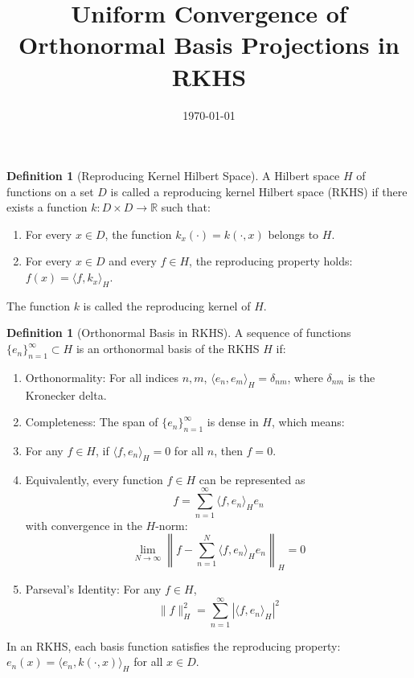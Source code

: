 \documentclass{article}
\theoremstyle{definition}
\newtheorem{definition}[theorem]{Definition}
\begin{document}
\title{Uniform Convergence of Orthonormal Basis Projections in RKHS}
\author{}
\date{\today}
\maketitle

\begin{definition}[Reproducing Kernel Hilbert Space]
A Hilbert space $H$ of functions on a set $D$ is called a reproducing kernel Hilbert space (RKHS) if there exists a function $k: D \times D \to \mathbb{R}$ such that:
\begin{enumerate}
    \item For every $x \in D$, the function $k_x(\cdot) = k(\cdot, x)$ belongs to $H$.
    \item For every $x \in D$ and every $f \in H$, the reproducing property holds: $f(x) = \langle f, k_x \rangle_H$.
\end{enumerate}
The function $k$ is called the reproducing kernel of $H$.
\end{definition}

\begin{definition}[Orthonormal Basis in RKHS]
\label{def:orthonormal_basis}
A sequence of functions $\{e_n\}_{n=1}^{\infty} \subset H$ is an orthonormal basis of the RKHS $H$ if:
\begin{enumerate}
    \item Orthonormality: For all indices $n, m$, $\langle e_n, e_m \rangle_H = \delta_{nm}$, where $\delta_{nm}$ is the Kronecker delta.
\item Completeness: The span of $\{e_n\}_{n=1}^{\infty}$ is dense in $H$, which means:
\item For any $f \in H$, if $\langle f, e_n \rangle_H = 0$ for all $n$, then $f = 0$.
\item Equivalently, every function $f \in H$ can be represented as
\[
f = \sum_{n=1}^{\infty} \langle f, e_n \rangle_H e_n
\]
with convergence in the $H$-norm:
\[
\lim_{N\to\infty} \left\|f - \sum_{n=1}^{N} \langle f, e_n \rangle_H e_n\right\|_H = 0
\]
\item Parseval's Identity: For any $f \in H$,
\[
\|f\|_H^2 = \sum_{n=1}^{\infty} |\langle f, e_n \rangle_H|^2
\]
\end{enumerate}
In an RKHS, each basis function satisfies the reproducing property: $e_n(x) = \langle e_n, k(\cdot,x) \rangle_H$ for all $x \in D$.
\end{definition}
\end{document}

